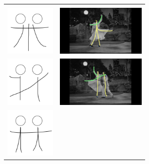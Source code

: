 \begin{table}[h!]
\begin{tabular}{ll}
\begin{minipage}{.28\textwidth}
    \end{minipage}\\
	\begin{minipage}{.28\textwidth}
      \includegraphics[width=\linewidth, height=25mm]{img/08keyframe}
    \end{minipage} &  
    \begin{minipage}{.28\textwidth}
      \includegraphics[width=\linewidth, height=25mm]{img/keyframe_case_8_(4)}
    \end{minipage}\\
	\begin{minipage}{.28\textwidth}
      \includegraphics[width=\linewidth, height=25mm]{img/09keyframe}
    \end{minipage} &  
    \begin{minipage}{.28\textwidth}
      \includegraphics[width=\linewidth, height=25mm]{img/keyframe_case_9_(4)}
    \end{minipage}\\
	\begin{minipage}{.28\textwidth}
      \includegraphics[width=\linewidth, height=25mm]{img/10keyframe}

\end{minipage}
\end{tabular}
\end{table}
